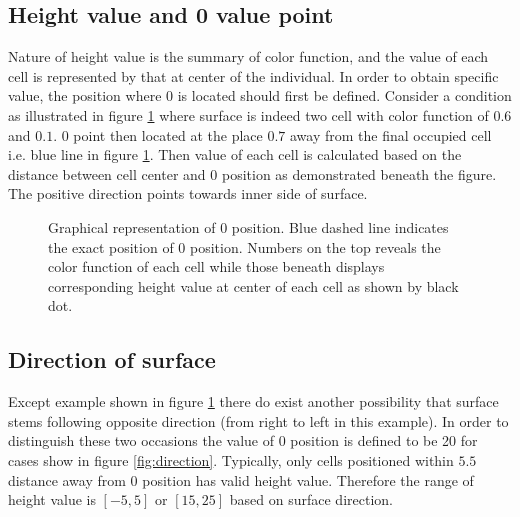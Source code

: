 \documentclass[a4paper]{article}
\newcommand{\para}[1]{\textbf{\emph{\textcolor{para}{#1}}}}
\begin{document}
\subsection{Height value and 0 value point}
Nature of height value is the summary of color function, and the value of each cell is represented by that at center of the individual. In order to obtain specific value, the position where $0$ is located should first be defined.
Consider a condition as illustrated in figure \ref{fig:0position} where surface is indeed two cell with color function of $0.6$ and $0.1$. 0 point then located at the place $0.7$ away from the final occupied cell i.e. blue line in figure \ref{fig:0position}. Then value of each cell is calculated based on the distance between cell center and 0 position as demonstrated beneath the figure. The positive direction points towards inner side of surface.
\begin{figure}
    \centering
    \caption{Graphical representation of 0 position. Blue dashed line indicates the exact position of 0 position. Numbers on the top reveals the color function of each cell while those beneath displays corresponding height value at center of each cell as shown by black dot.}
    \label{fig:0position}
\end{figure}
\subsection{Direction of surface}
Except example shown in figure \ref{fig:0position} there do exist another possibility that surface stems following opposite direction (from right to left in this example). In order to distinguish these two occasions the value of 0 position is defined to be 20 for cases show in figure \ref{fig:direction}. Typically, only cells positioned within $5.5$ distance away from 0 position has valid height value. Therefore the range of height value is $[-5,5]$ or $[15,25]$ based on surface direction.
\end{document}

